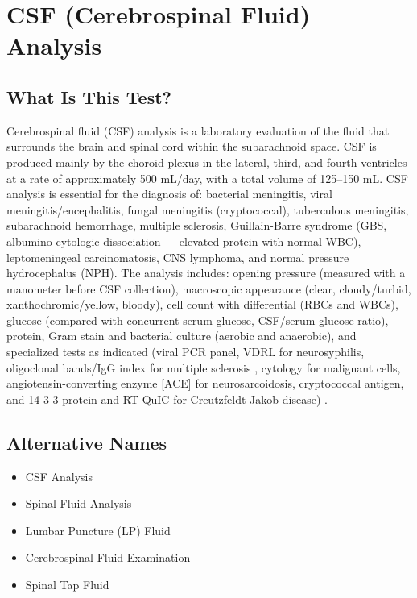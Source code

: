 \chapter{CSF (Cerebrospinal Fluid) Analysis}
\section*{What Is This Test?}
Cerebrospinal fluid (CSF) analysis is a laboratory evaluation of the fluid that surrounds the brain and spinal cord within the subarachnoid space. CSF is produced mainly by the choroid plexus in the lateral, third, and fourth ventricles at a rate of approximately 500 mL/day, with a total volume of 125--150 mL. CSF analysis is essential for the diagnosis of: bacterial meningitis, viral meningitis/encephalitis, fungal meningitis (cryptococcal), tuberculous meningitis, subarachnoid hemorrhage, multiple sclerosis, Guillain-Barre syndrome (GBS, albumino-cytologic dissociation --- elevated protein with normal WBC), leptomeningeal carcinomatosis, CNS lymphoma, and normal pressure hydrocephalus (NPH). The analysis includes: opening pressure (measured with a manometer before CSF collection), macroscopic appearance (clear, cloudy/turbid, xanthochromic/yellow, bloody), cell count with differential (RBCs and WBCs), glucose (compared with concurrent serum glucose, CSF/serum glucose ratio), protein, Gram stain and bacterial culture (aerobic and anaerobic), and specialized tests as indicated (viral PCR panel, VDRL for neurosyphilis, oligoclonal bands/IgG index for multiple sclerosis \cite{freedman2005recommended}, cytology for malignant cells, angiotensin-converting enzyme [ACE] for neurosarcoidosis, cryptococcal antigen, and 14-3-3 protein and RT-QuIC for Creutzfeldt-Jakob disease) \cite{seehusen2003cerebrospinal}.
\section*{Alternative Names}
\begin{itemize}
  \item CSF Analysis
  \item Spinal Fluid Analysis
  \item Lumbar Puncture (LP) Fluid
  \item Cerebrospinal Fluid Examination
  \item Spinal Tap Fluid
\end{itemize}
